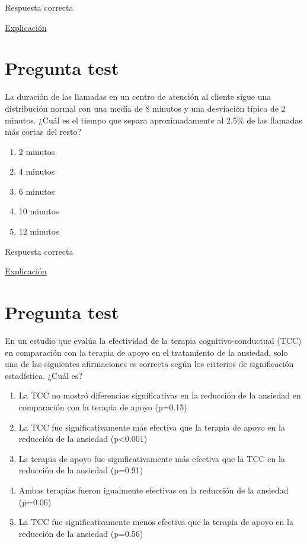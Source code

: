 \documentclass[
]{book}
\providecommand{\tightlist}{%
  \setlength{\itemsep}{0pt}\setlength{\parskip}{0pt}}
\begin{document}
Respuesta correcta

\href{https://1fjmanzano.github.io/bioestadistica/contrastes-de-hipo\%CC\%81tesis.html\#contrastes-bilaterales-y-unilaterales}{Explicación}

\hypertarget{pregunta-test-118}{%
\section{Pregunta test}\label{pregunta-test-118}}

La duración de las llamadas en un centro de atención al cliente sigue una distribución normal con una media de 8 minutos y una desviación típica de 2 minutos. ¿Cuál es el tiempo que separa aproximadamente al 2.5\% de las llamadas más cortas del resto?

\begin{enumerate}
\def\labelenumi{\alph{enumi})}
\tightlist
\item
  2 minutos
\item
  4 minutos
\item
  6 minutos
\item
  10 minutos
\item
  12 minutos
\end{enumerate}

Respuesta correcta

\href{https://homepage.divms.uiowa.edu/~mbognar/applets/normal.html}{Explicación}

\hypertarget{pregunta-test-119}{%
\section{Pregunta test}\label{pregunta-test-119}}

En un estudio que evalúa la efectividad de la terapia cognitivo-conductual (TCC) en comparación con la terapia de apoyo en el tratamiento de la ansiedad, solo una de las siguientes afirmaciones es correcta según los criterios de significación estadística. ¿Cuál es?

\begin{enumerate}
\def\labelenumi{\alph{enumi})}
\tightlist
\item
  La TCC no mostró diferencias significativas en la reducción de la ansiedad en comparación con la terapia de apoyo (p=0.15)
\item
  La TCC fue significativamente más efectiva que la terapia de apoyo en la reducción de la ansiedad (p\textless0.001)
\item
  La terapia de apoyo fue significativamente más efectiva que la TCC en la reducción de la ansiedad (p=0.91)
\item
  Ambas terapias fueron igualmente efectivas en la reducción de la ansiedad (p=0.06)
\item
  La TCC fue significativamente menos efectiva que la terapia de apoyo en la reducción de la ansiedad (p=0.56)
\end{enumerate}
\end{document}
